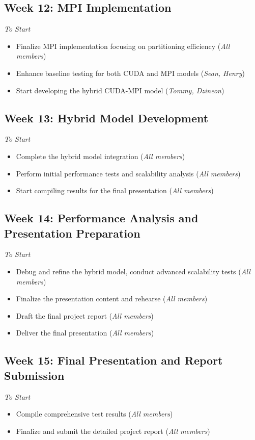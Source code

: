 \documentclass[11pt]{article}
\begin{document}
\subsection*{Week 12: MPI Implementation} 
\textit{To Start}
\begin{itemize}
    \item Finalize MPI implementation focusing on partitioning efficiency (\textit{All members})
    \item Enhance baseline testing for both CUDA and MPI models (\textit{Sean, Henry})
    \item Start developing the hybrid CUDA-MPI model (\textit{Tommy, Dzineon})
\end{itemize}

\subsection*{Week 13: Hybrid Model Development} 
\textit{To Start}
\begin{itemize}
    \item Complete the hybrid model integration (\textit{All members})
    \item Perform initial performance tests and scalability analysis (\textit{All members})
    \item Start compiling results for the final presentation (\textit{All members})
\end{itemize}

\subsection*{Week 14: Performance Analysis and Presentation Preparation} 
\textit{To Start}
\begin{itemize}
    \item Debug and refine the hybrid model, conduct advanced scalability tests (\textit{All members})
    \item Finalize the presentation content and rehearse (\textit{All members})
    \item Draft the final project report (\textit{All members})
    \item Deliver the final presentation (\textit{All members})
\end{itemize}

\subsection*{Week 15: Final Presentation and Report Submission} 
\textit{To Start}
\begin{itemize}
    \item Compile comprehensive test results (\textit{All members})
    \item Finalize and submit the detailed project report (\textit{All members})
\end{itemize}
\end{document}
